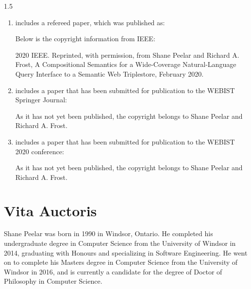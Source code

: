 \documentclass[fleqn, oneside, 12pt]{book}
\theoremstyle{definitionsty}
\newcommand{\uwinonehalfspacelen}{1.5}
\newcommand{\uwindefaultspacelen}{\uwinonehalfspacelen}
\newenvironment{uwindefaultspaceenv}%
{\begin{spacing}{\uwindefaultspacelen}}%
	{\end{spacing}}
\begin{document}
\begin{uwindefaultspaceenv}
\begin{enumerate}
	\item { includes a refereed paper, which was published as:


		Below is the copyright information from IEEE:

		2020 IEEE. Reprinted, with permission, from Shane Peelar and Richard A. Frost, A Compositional Semantics for a Wide-Coverage Natural-Language Query Interface to a Semantic Web Triplestore, February 2020.}

	\item { includes a paper that has been submitted for publication to the WEBIST Springer Journal:


    As it has not yet been published, the copyright belongs to Shane Peelar and Richard A. Frost.
    }

	\item { includes a paper that has been submitted for publication to the WEBIST 2020 conference:


    As it has not yet been published, the copyright belongs to Shane Peelar and Richard A. Frost.

    }
\end{enumerate}








\chapter*{Vita Auctoris}

Shane Peelar was born in 1990 in Windsor, Ontario.  He completed his undergraduate degree in Computer Science from the University of Windsor in 2014, graduating with Honours and specializing in Software Engineering.  He went on to complete his Masters degree in Computer Science from the University of Windsor in 2016, and is currently a candidate for the degree of Doctor of Philosophy in Computer Science.

\end{uwindefaultspaceenv}
\end{document}
